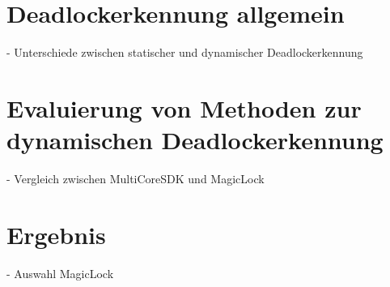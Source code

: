 \section{Deadlockerkennung allgemein}
- Unterschiede zwischen statischer und dynamischer Deadlockerkennung

\section{Evaluierung von Methoden zur dynamischen Deadlockerkennung}
- Vergleich zwischen MultiCoreSDK und MagicLock

\section{Ergebnis}
- Auswahl MagicLock\cite{MagicLock}